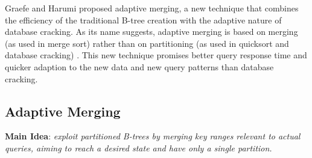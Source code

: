 \documentclass[10pt, conference, compsocconf]{IEEEtran}
\begin{document}
Graefe and Harumi proposed adaptive merging, a new technique that combines the efficiency of the traditional B-tree creation with the adaptive nature of database cracking. As its name suggests, adaptive merging is based on merging (as used in merge sort) rather than on partitioning (as used in quicksort and database cracking) \cite{merging}. This new technique promises better query response time and quicker adaption to the new data and new query patterns than database cracking.

\subsection{Adaptive Merging}
\label{subsec:st_merging}
\textbf{Main Idea}: \textit{exploit partitioned B-trees \cite{partitionedtrees} by merging key ranges relevant to actual queries, aiming to reach a desired state and have only a single partition.}\\
\end{document}
